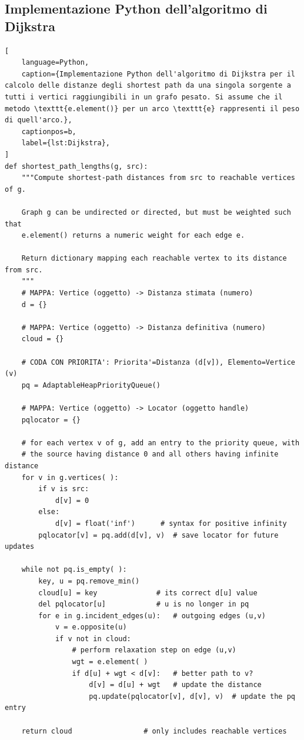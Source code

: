 \subsection{Implementazione Python dell'algoritmo di Dijkstra}
\begin{lstlisting}[
    language=Python,
    caption={Implementazione Python dell'algoritmo di Dijkstra per il calcolo delle distanze degli shortest path da una singola sorgente a tutti i vertici raggiungibili in un grafo pesato. Si assume che il metodo \texttt{e.element()} per un arco \texttt{e} rappresenti il peso di quell'arco.},
    captionpos=b,
    label={lst:Dijkstra},
]
def shortest_path_lengths(g, src):
    """Compute shortest-path distances from src to reachable vertices of g.

    Graph g can be undirected or directed, but must be weighted such that
    e.element() returns a numeric weight for each edge e.

    Return dictionary mapping each reachable vertex to its distance from src.
    """
    # MAPPA: Vertice (oggetto) -> Distanza stimata (numero)
    d = {}

    # MAPPA: Vertice (oggetto) -> Distanza definitiva (numero)
    cloud = {}

    # CODA CON PRIORITA': Priorita'=Distanza (d[v]), Elemento=Vertice (v)
    pq = AdaptableHeapPriorityQueue()

    # MAPPA: Vertice (oggetto) -> Locator (oggetto handle)
    pqlocator = {}

    # for each vertex v of g, add an entry to the priority queue, with
    # the source having distance 0 and all others having infinite distance
    for v in g.vertices( ):
        if v is src:
            d[v] = 0
        else:
            d[v] = float('inf')      # syntax for positive infinity
        pqlocator[v] = pq.add(d[v], v)  # save locator for future updates

    while not pq.is_empty( ):
        key, u = pq.remove_min()
        cloud[u] = key              # its correct d[u] value
        del pqlocator[u]            # u is no longer in pq
        for e in g.incident_edges(u):   # outgoing edges (u,v)
            v = e.opposite(u)
            if v not in cloud:
                # perform relaxation step on edge (u,v)
                wgt = e.element( )
                if d[u] + wgt < d[v]:   # better path to v?
                    d[v] = d[u] + wgt   # update the distance
                    pq.update(pqlocator[v], d[v], v)  # update the pq entry

    return cloud                 # only includes reachable vertices
\end{lstlisting}

